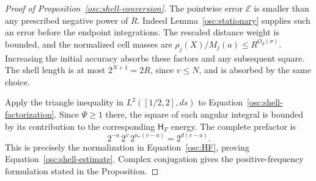 \begin{proof}[Proof of Proposition~\ref{osc:shell-conversion}]
The pointwise error $\mathcal E$ is smaller than any prescribed negative
power of $R$.  Indeed Lemma~\ref{osc:stationary} supplies such an error
before the endpoint integrations.  The rescaled distance weight is
bounded, and the normalized cell masses are
$\rho_j(X)/M_j(a)\le R^{O_d(\sigma)}$.  Increasing the initial accuracy
absorbs these factors and any subsequent square.  The shell length is at
most $2^{N+1}=2R$, since $v\le N$, and is absorbed by the same choice.

Apply the triangle inequality in $L^2([1/2,2],ds)$ to
Equation~\eqref{osc:shell-factorization}.  Since $\Psi\ge1$ there, the
square of each angular integral is bounded by its contribution to the
corresponding $\mathsf H_F$ energy.  The complete prefactor is
\begin{equation}\label{osc:normalization-identity}
 2^{-a}\,2^v\,2^{n_*(v-a)}=2^{d(v-a)}.
\end{equation}
This is precisely the normalization in Equation~\eqref{osc:HF}, proving
Equation~\eqref{osc:shell-estimate}.  Complex conjugation gives the
positive-frequency formulation stated in the Proposition.
\end{proof}
